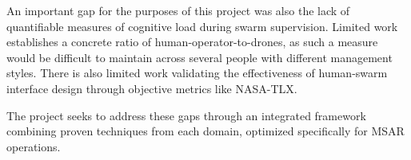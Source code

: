 An important gap for the purposes of this project was also the lack of quantifiable measures of cognitive load during swarm supervision.
Limited work establishes a concrete ratio of human-operator-to-drones, as such a measure would be difficult to maintain across several people with different management styles.
There is also limited work validating the effectiveness of human-swarm interface design through objective metrics like NASA-TLX\@.

The project seeks to address these gaps through an integrated framework combining proven techniques from each domain, optimized specifically for MSAR operations.
